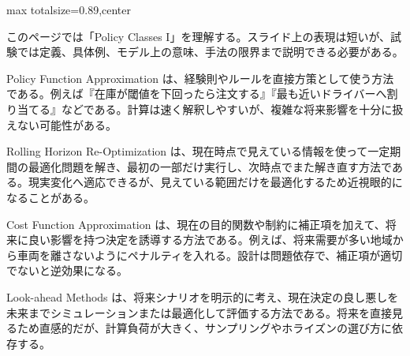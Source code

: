 \begin{minipage}[t]{0.58\textwidth}
\begin{adjustbox}{max totalsize={\textwidth}{0.89\textheight},center}
\begin{minipage}{\textwidth}\scriptsize
{}このページでは「Policy Classes I」を理解する。スライド上の表現は短いが、試験では定義、具体例、モデル上の意味、手法の限界まで説明できる必要がある。\par
Policy Function Approximation は、経験則やルールを直接方策として使う方法である。例えば『在庫が閾値を下回ったら注文する』『最も近いドライバーへ割り当てる』などである。計算は速く解釈しやすいが、複雑な将来影響を十分に扱えない可能性がある。\par
Rolling Horizon Re-Optimization は、現在時点で見えている情報を使って一定期間の最適化問題を解き、最初の一部だけ実行し、次時点でまた解き直す方法である。現実変化へ適応できるが、見えている範囲だけを最適化するため近視眼的になることがある。\par
Cost Function Approximation は、現在の目的関数や制約に補正項を加えて、将来に良い影響を持つ決定を誘導する方法である。例えば、将来需要が多い地域から車両を離さないようにペナルティを入れる。設計は問題依存で、補正項が適切でないと逆効果になる。\par
Look-ahead Methods は、将来シナリオを明示的に考え、現在決定の良し悪しを未来までシミュレーションまたは最適化して評価する方法である。将来を直接見るため直感的だが、計算負荷が大きく、サンプリングやホライズンの選び方に依存する。\par

\end{minipage}
\end{adjustbox}
\end{minipage}
